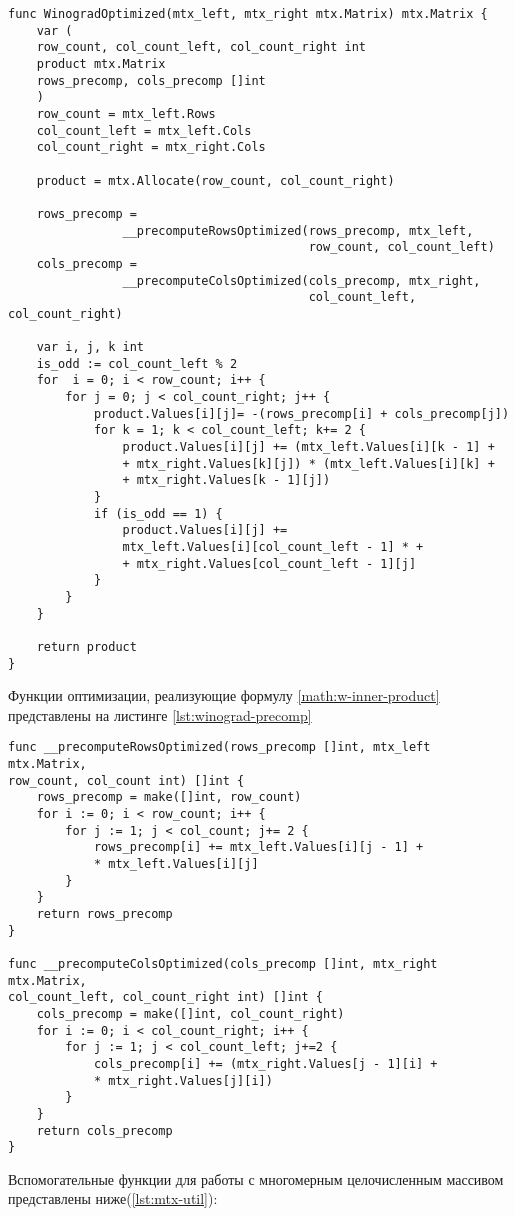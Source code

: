 \begin{lstlisting}[label=lst:winograd-optimized,caption=Оптимизированный алгоритм умнложения Виноградом]
func WinogradOptimized(mtx_left, mtx_right mtx.Matrix) mtx.Matrix {
	var (
	row_count, col_count_left, col_count_right int
	product mtx.Matrix
	rows_precomp, cols_precomp []int
	)
	row_count = mtx_left.Rows
	col_count_left = mtx_left.Cols
	col_count_right = mtx_right.Cols
	
	product = mtx.Allocate(row_count, col_count_right)
	
	rows_precomp = 
				__precomputeRowsOptimized(rows_precomp, mtx_left,
										  row_count, col_count_left)
	cols_precomp =
				__precomputeColsOptimized(cols_precomp, mtx_right,
									      col_count_left, col_count_right)
	
	var i, j, k int
	is_odd := col_count_left % 2
	for  i = 0; i < row_count; i++ {
		for j = 0; j < col_count_right; j++ {
			product.Values[i][j]= -(rows_precomp[i] + cols_precomp[j])
			for k = 1; k < col_count_left; k+= 2 {
				product.Values[i][j] += (mtx_left.Values[i][k - 1] +
				+ mtx_right.Values[k][j]) * (mtx_left.Values[i][k] + 
				+ mtx_right.Values[k - 1][j])
			}
			if (is_odd == 1) {
				product.Values[i][j] += 
				mtx_left.Values[i][col_count_left - 1] * +
				+ mtx_right.Values[col_count_left - 1][j]
			}
		}
	}
	
	return product
}
\end{lstlisting}
Функции оптимизации, реализующие формулу \ref{math:w-inner-product} представлены на листинге \ref{lst:winograd-precomp}
\begin{lstlisting}[label=lst:winograd-precomp,caption=Функции препроцессирования для алгоримов Винограда]
func __precomputeRowsOptimized(rows_precomp []int, mtx_left mtx.Matrix,
row_count, col_count int) []int {
	rows_precomp = make([]int, row_count)
	for i := 0; i < row_count; i++ {
		for j := 1; j < col_count; j+= 2 {
			rows_precomp[i] += mtx_left.Values[i][j - 1] +
			* mtx_left.Values[i][j]
		}
	}
	return rows_precomp
}

func __precomputeColsOptimized(cols_precomp []int, mtx_right mtx.Matrix,
col_count_left, col_count_right int) []int {
	cols_precomp = make([]int, col_count_right)
	for i := 0; i < col_count_right; i++ {
		for j := 1; j < col_count_left; j+=2 {
			cols_precomp[i] += (mtx_right.Values[j - 1][i] +
			* mtx_right.Values[j][i])
		}
	}
	return cols_precomp
}
\end{lstlisting}

Вспомогательные функции для работы с многомерным целочисленным массивом представлены ниже(\ref{lst:mtx-util}):

